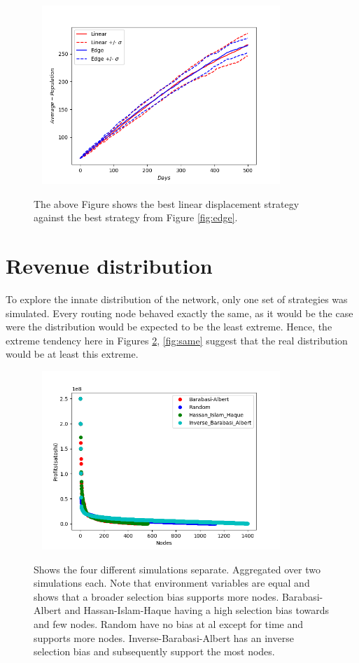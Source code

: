\begin{figure}[!htb]
	\hspace*{-0.7cm}\
	\centering
	\includegraphics[width=9cm]{images/histories_edge_linear.png}
	\caption{ The above Figure shows the best linear displacement strategy against the best strategy from Figure \ref{fig:edge}.
	}
	\label{fig:funding}
	\hspace*{2mm} 
\end{figure}

\newpage
\section{Revenue distribution}

To explore the innate distribution of the network, only one set of strategies was simulated. Every routing node behaved exactly the same, as it would be the case were the distribution would be expected to be the least extreme. Hence, the extreme tendency here in Figures \ref{fig:path}, \ref{fig:same} suggest that the real distribution would be at least this extreme.   

\begin{figure}[!htb]
	\hspace*{-0.7cm}\
	\centering
	\includegraphics[width=9cm]{images/wealth_distribution_path.png}
	\caption{ Shows the four different simulations separate. Aggregated over two simulations each. Note that environment variables are equal and shows that a broader selection bias supports more nodes. Barabasi-Albert and Hassan-Islam-Haque having a high selection bias towards and few nodes. Random have no bias at al except for time and supports more nodes. Inverse-Barabasi-Albert has an inverse selection bias and subsequently support the most nodes. 
	}
	\label{fig:path}

\end{figure}

